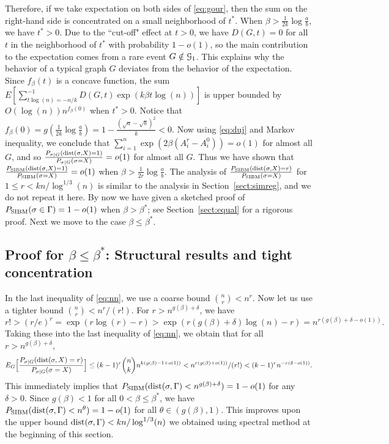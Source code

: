 \documentclass{article}
\begin{document}
Therefore, if we take expectation on both sides of \eqref{eq:gour}, then the sum on the right-hand side is concentrated on a small neighborhood of $t^\ast$. When $\beta>\frac{1}{2k}\log\frac{a}{b}$, we have $t^\ast>0$. Due to the ``cut-off" effect at $t>0$, we have $D(G,t)=0$ for all $t$ in the neighborhood of $t^\ast$ with probability $1-o(1)$, so the main contribution to the expectation comes from a rare event $G\notin\mathcal{G}_1$. This explains why the behavior of a typical graph $G$ deviates from the behavior of the expectation.
Since $f_{\beta}(t)$ is a concave function, the sum $E[\sum_{t\log(n)=-n/k}^{-1}
D(G,t) \exp (k\beta t \log(n) )]$
is upper bounded by $O(\log(n))n^{f_{\beta}(0)}$  when $t^\ast>0$.
Notice that $f_{\beta}(0)=g(\frac{1}{2k}\log\frac{a}{b})=1-\frac{(\sqrt{a}-\sqrt{b})^2}{k}<0$.
Now using \eqref{eq:duj} and Markov inequality, we conclude that $\sum_{i=1}^n \exp (2 \beta (A^r_i-A^0_i))=o(1)$ for almost all $G$,
and so $\frac{P_{\sigma|G} ( \operatorname{dist}(\sigma, X) = 1 )}{P_{\sigma|G}(\sigma= X)} =o(1)$ for almost all $G$. Thus we have shown that $\frac{P_{\operatorname{SIBM}} ( \operatorname{dist}(\sigma, X) = 1 )}{P_{\operatorname{SIBM}}(\sigma= X)}=o(1)$ when
$\beta>\frac{1}{2r}\log\frac{a}{b}$.
The analysis of $\frac{P_{\operatorname{SIBM}} ( \operatorname{dist}(\sigma, X) = r )}{P_{\operatorname{SIBM}}(\sigma= X)}$ for $1\le r<kn/\log^{1/3}(n)$ is
similar to the analysis in Section~\ref{sect:simreg}, and we do not repeat it here. By now we have given a sketched proof of
$P_{\operatorname{SIBM}}(\sigma \in \Gamma)=1-o(1)$ when $\beta>\beta^\ast$; see Section~\ref{sect:equal} for a rigorous proof. Next we move to the case $\beta\le\beta^\ast$.

\subsection{Proof for $\beta\le\beta^\ast$: Structural results and tight concentration}

In the last inequality of \eqref{eq:nn}, we use a coarse bound $\binom{n}{r}<n^r$. Now let us use a tighter bound $\binom{n}{r}<n^r/(r!)$. 
For $r>n^{g(\beta)+\delta}$, we have
$
r!>(r/e)^r
=\exp(r\log(r)-r)
>\exp(r(g(\beta)+\delta)\log(n)-r)
=n^{r(g(\beta)+\delta-o(1))} .
$
Taking these into the last inequality of \eqref{eq:nn}, we obtain that for all $r>n^{g(\beta)+\delta}$,
$$
E_G \Big[ \frac{P_{\sigma|G} ( \operatorname{dist}(\sigma, X) = r )}{P_{\sigma|G}(\sigma= X)} \Big]
\le  (k-1)^r\binom{n}{k} n^{k (g(\beta)-1+o(1))}
< n^{r (g(\beta)+o(1))} /(r!) 
< (k-1)^rn^{-r(\delta-o(1))} .
$$
This immediately implies that  $P_{\operatorname{SIBM}} (\operatorname{dist}(\sigma, \Gamma)<n^{g(\beta)+\delta} ) = 1- o(1)$ for any $\delta>0$. Since $g(\beta)<1$ for all $0<\beta\le\beta^\ast$, we have $P_{\operatorname{SIBM}} (\operatorname{dist}(\sigma, \Gamma)<n^{\theta} ) = 1- o(1)$ for all $\theta\in (g(\beta), 1)$. This improves upon the upper bound 
$\operatorname{dist}(\sigma, \Gamma)< kn/\log^{1/3}(n)$ we obtained using spectral method at the beginning of this section.
\end{document}
